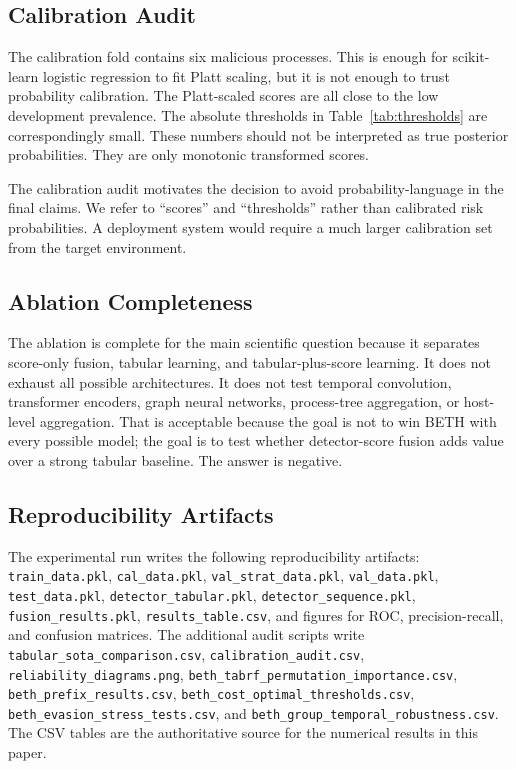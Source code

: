 \documentclass[journal]{IEEEtran}
\begin{document}
\subsection{Calibration Audit}

The calibration fold contains six malicious processes. This is enough for scikit-learn logistic regression to fit Platt scaling, but it is not enough to trust probability calibration. The Platt-scaled scores are all close to the low development prevalence. The absolute thresholds in Table~\ref{tab:thresholds} are correspondingly small. These numbers should not be interpreted as true posterior probabilities. They are only monotonic transformed scores.

The calibration audit motivates the decision to avoid probability-language in the final claims. We refer to ``scores'' and ``thresholds'' rather than calibrated risk probabilities. A deployment system would require a much larger calibration set from the target environment.

\subsection{Ablation Completeness}

The ablation is complete for the main scientific question because it separates score-only fusion, tabular learning, and tabular-plus-score learning. It does not exhaust all possible architectures. It does not test temporal convolution, transformer encoders, graph neural networks, process-tree aggregation, or host-level aggregation. That is acceptable because the goal is not to win BETH with every possible model; the goal is to test whether detector-score fusion adds value over a strong tabular baseline. The answer is negative.

\subsection{Reproducibility Artifacts}

The experimental run writes the following reproducibility artifacts: \texttt{train\_data.pkl}, \texttt{cal\_data.pkl}, \texttt{val\_strat\_data.pkl}, \texttt{val\_data.pkl}, \texttt{test\_data.pkl}, \texttt{detector\_tabular.pkl}, \texttt{detector\_sequence.pkl}, \texttt{fusion\_results.pkl}, \texttt{results\_table.csv}, and figures for ROC, precision-recall, and confusion matrices. The additional audit scripts write \texttt{tabular\_sota\_comparison.csv}, \texttt{calibration\_audit.csv}, \texttt{reliability\_diagrams.png}, \texttt{beth\_tabrf\_permutation\_importance.csv}, \texttt{beth\_prefix\_results.csv}, \texttt{beth\_cost\_optimal\_thresholds.csv}, \texttt{beth\_evasion\_stress\_tests.csv}, and \texttt{beth\_group\_temporal\_robustness.csv}. The CSV tables are the authoritative source for the numerical results in this paper.
\end{document}
